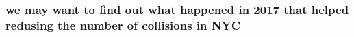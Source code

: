 \documentclass[
]{article}
\begin{document}
\hypertarget{we-may-want-to-find-out-what-happened-in-2017-that-helped-redusing-the-number-of-collisions-in-nyc}{%
\subsubsection{we may want to find out what happened in 2017 that helped
redusing the number of collisions in
NYC}\label{we-may-want-to-find-out-what-happened-in-2017-that-helped-redusing-the-number-of-collisions-in-nyc}}
\end{document}
